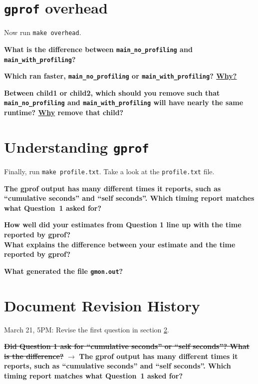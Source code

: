 \documentclass{article}
\begin{document}
\section{\texttt{gprof} overhead}

Now run \texttt{make~overhead}.

\textbf{What is the difference between \texttt{main\_no\_profiling} and
  \texttt{main\_with\_profiling}?}
\vspace{2cm}

\textbf{Which ran faster, \texttt{main\_no\_profiling} or
  \texttt{main\_with\_profiling}? \ul{Why?}}
\vspace{3cm}

\textbf{Between child1 or child2, which should you remove such that
  \texttt{main\_no\_profiling} and \texttt{main\_with\_profiling} will have
  nearly the same runtime? \ul{Why} remove that child?}

\newpage
\section{Understanding \texttt{gprof}}
\label{understanding}

Finally, run \texttt{make~profile.txt}. Take a look at the
\texttt{profile.txt} file.

\textbf{The gprof output has many different times it reports, such as
  ``cumulative seconds'' and ``self seconds''. Which timing report matches
  what Question~1 asked for?}
\vspace{3cm}

\textbf{How well did your estimates from Question 1 line up with the time
  reported by gprof?\\
  What explains the difference between your estimate and
  the time reported by gprof?}
\vspace{4cm}

\textbf{What generated the file \texttt{gmon.out}?}
\vspace{3cm}


\newpage
\section*{Document Revision History}
March 21, 5PM: Revise the first question in section \ref{understanding}.

\textbf{\st{Did Question 1 ask for ``cumulative seconds'' or ``self seconds''?  What is the difference?}} 
$\rightarrow$
\textbf{The gprof output has many different times it reports, such as
  ``cumulative seconds'' and ``self seconds''. Which timing report matches
  what Question~1 asked for?}
\end{document}
